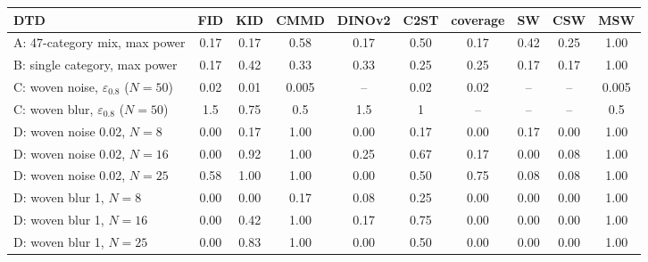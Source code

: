 \begin{tabular}{lccccccccc}
\toprule
DTD & FID & KID & CMMD & DINOv2 & C2ST & coverage & SW & CSW & MSW \\
\midrule
A: 47-category mix, max power & 0.17 & 0.17 & 0.58 & 0.17 & 0.50 & 0.17 & 0.42 & 0.25 & 1.00 \\
B: single category, max power & 0.17 & 0.42 & 0.33 & 0.33 & 0.25 & 0.25 & 0.17 & 0.17 & 1.00 \\
C: woven noise, $\varepsilon_{0.8}$ ($N{=}50$) & 0.02 & 0.01 & 0.005 & -- & 0.02 & 0.02 & -- & -- & 0.005 \\
C: woven blur, $\varepsilon_{0.8}$ ($N{=}50$) & 1.5 & 0.75 & 0.5 & 1.5 & 1 & -- & -- & -- & 0.5 \\
D: woven noise 0.02, $N{=}8$ & 0.00 & 0.17 & 1.00 & 0.00 & 0.17 & 0.00 & 0.17 & 0.00 & 1.00 \\
D: woven noise 0.02, $N{=}16$ & 0.00 & 0.92 & 1.00 & 0.25 & 0.67 & 0.17 & 0.00 & 0.08 & 1.00 \\
D: woven noise 0.02, $N{=}25$ & 0.58 & 1.00 & 1.00 & 0.00 & 0.50 & 0.75 & 0.08 & 0.08 & 1.00 \\
D: woven blur 1, $N{=}8$ & 0.00 & 0.00 & 0.17 & 0.08 & 0.25 & 0.00 & 0.00 & 0.00 & 1.00 \\
D: woven blur 1, $N{=}16$ & 0.00 & 0.42 & 1.00 & 0.17 & 0.75 & 0.00 & 0.00 & 0.00 & 1.00 \\
D: woven blur 1, $N{=}25$ & 0.00 & 0.83 & 1.00 & 0.00 & 0.50 & 0.00 & 0.00 & 0.00 & 1.00 \\
\bottomrule
\end{tabular}
